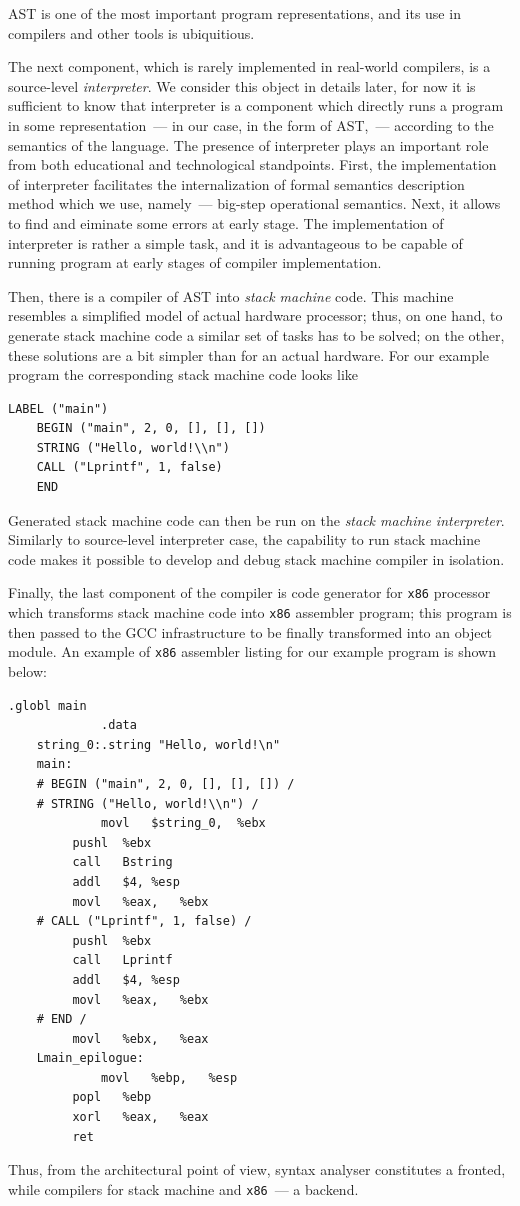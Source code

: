 AST is one of the most important program representations, and its use in compilers and other
tools is ubiquitious. 

The next component, which is rarely implemented in real-world compilers, is a source-level \emph{interpreter}. We
consider this object in details later, for now it is sufficient to know that interpreter is a component which
directly runs a program in some representation~--- in our case, in the form of AST,~--- according to the semantics of the language. 
The presence of interpreter plays an important role from both educational and technological standpoints. First,
the implementation of interpreter facilitates the internalization of formal semantics description method which
we use, namely~--- big-step operational semantics. Next, it allows to find and eiminate some errors 
at early stage. The implementation of interpreter is rather a simple task, and it is advantageous to be capable of running program
at early stages of compiler implementation.

Then, there is a compiler of AST into \emph{stack machine} code. This machine resembles a simplified model of
actual hardware processor; thus, on one hand, to generate stack machine code a similar set of tasks has to be
solved; on the other, these solutions are a bit simpler than for an actual hardware. For our example
program the corresponding stack machine code looks like

\begin{lstlisting}[language=plain,basicstyle=\small]
    LABEL ("main")
    BEGIN ("main", 2, 0, [], [], [])
    STRING ("Hello, world!\\n")
    CALL ("Lprintf", 1, false)
    END      
\end{lstlisting}

Generated stack machine code can then be run on the \emph{stack machine interpreter}. Similarly to source-level
interpreter case, the capability to run stack machine code makes it possible to develop and debug stack
machine compiler in isolation.

Finally, the last component of the compiler is code generator for \texttt{x86} processor which
transforms stack machine code into \texttt{x86} assembler program; this program is then passed to
the \textsc{GCC} infrastructure to be finally transformed into an object module. An example of
\texttt{x86} assembler listing for our example program is shown below:

\begin{lstlisting}[language=plain,basicstyle=\small]
             .globl	main
             .data
    string_0:.string "Hello, world!\n"
    main:
    # BEGIN ("main", 2, 0, [], [], []) / 
    # STRING ("Hello, world!\\n") / 
             movl	$string_0,	%ebx
	     pushl	%ebx
	     call	Bstring
	     addl	$4,	%esp
	     movl	%eax,	%ebx
    # CALL ("Lprintf", 1, false) / 
	     pushl	%ebx
	     call	Lprintf
	     addl	$4,	%esp
	     movl	%eax,	%ebx
    # END / 
	     movl	%ebx,	%eax
    Lmain_epilogue:
             movl	%ebp,	%esp
	     popl	%ebp
	     xorl	%eax,	%eax
	     ret
\end{lstlisting}

Thus, from the architectural point of view, syntax analyser constitutes a fronted, while compilers for
stack machine and \texttt{x86}~--- a backend.

